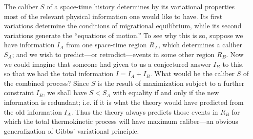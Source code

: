\documentclass{article}
\begin{document}
The caliber $S$ of a space-time history determines by its variational properties most of the relevant physical information one would like to have. Its first variations determine the conditions of migrational equilibrium, while its second variations generate the ``equations of motion.'' To see why this is so, suppose we have information $I_A$ from one space-time region $R_A$, which determines a caliber $S_A$; and we wish to predict---or retrodict---events in some other region $R_B$. Now we could imagine that someone had given to us a conjectured answer $I_B$ to this, so that we had the total information $I=I_A+I_B$. What would be the caliber $S$ of the combined process? Since $S$ is the result of maximization subject to a further constraint $I_B$, we shall have $S<S_A$ with equality if and only if the new information is redundant; i.e. if it is what the theory would have predicted from the old information $I_A$. Thus the theory always predicts those events in $R_B$ for which the total thermokinetic process will have maximum caliber---an obvious generalization of Gibbs' variational principle.
\end{document}
